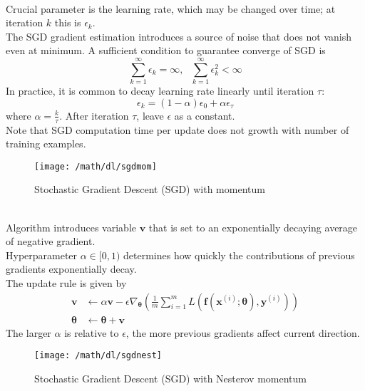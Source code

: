 \begin{remark} \\
Crucial parameter is the learning rate, which may be changed over time; at iteration $k$ this is $\epsilon_k$.\\
The SGD gradient estimation introduces a source of noise that does not vanish even at minimum. A sufficient condition to guarantee converge of SGD is
\begin{equation}
\sum\limits_{k=1}^{\infty} \epsilon_k = \infty, \ \ \ \sum\limits_{k=1}^{\infty} \epsilon_k^2 < \infty \nonumber
\end{equation}
In practice, it is common to decay learning rate linearly until iteration $\tau$:
\begin{equation}
\epsilon_k = (1- \alpha)\epsilon_0 + \alpha \epsilon_{\tau} \nonumber
\end{equation}
where $\alpha = \frac{k}{\tau}$. After iteration $\tau$, leave $\epsilon$ as a constant.\\
Note that SGD computation time per update does not growth with number of training examples.
\end{remark}

\begin{figure}[H]
\centering
\texttt{[image: /math/dl/sgdmom]}
\caption{Stochastic Gradient Descent (SGD) with momentum}
\end{figure}

\begin{remark} \\
Algorithm introduces variable $\bm{v}$ that is set to an exponentially decaying average of negative gradient.\\
Hyperparameter $\alpha \in [0, 1)$ determines how quickly the contributions of previous gradients exponentially decay.\\
The update rule is given by
\begin{align}
\bm{v} &\leftarrow \alpha \bm{v} - \epsilon \nabla_{\bm{\theta}} \left(\frac{1}{m} \sum\limits_{i=1}^m L(\bm{f}(\bm{x}^{(i)}; \bm{\theta}), \bm{y}^{(i)}) \right) \nonumber \\
\bm{\theta} &\leftarrow \bm{\theta} + \bm{v} \nonumber
\end{align}
The larger $\alpha$ is relative to $\epsilon$, the more previous gradients affect current direction.
\end{remark}

\begin{figure}[H]
\centering
\texttt{[image: /math/dl/sgdnest]}
\caption{Stochastic Gradient Descent (SGD) with Nesterov momentum}
\end{figure}

